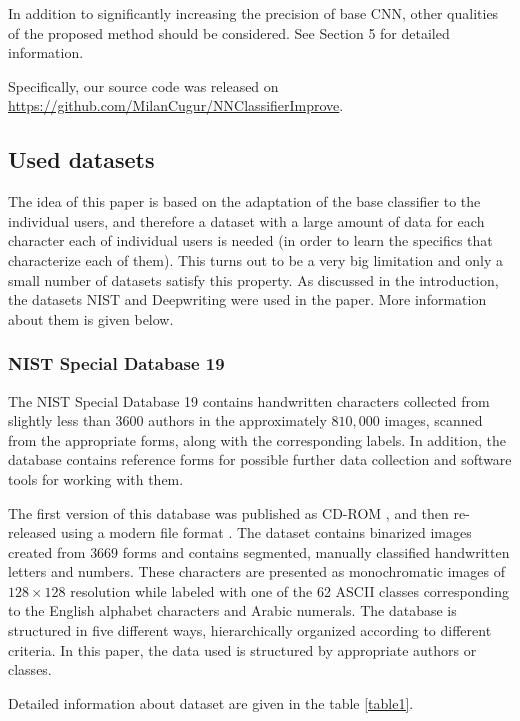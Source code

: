\documentclass{article}
\begin{document}
In addition to significantly increasing the precision of base CNN, other qualities of the proposed method should be considered.
See Section 5 for detailed information. %

Specifically, our source code was released on \url{https://github.com/MilanCugur/NNClassifierImprove}.

\subsection{Used datasets}

The idea of this paper is based on the adaptation of the base classifier to the individual users,
and therefore a dataset with a large amount of data for each character each of individual users is needed
(in order to learn the specifics that characterize each of them).
This turns out to be a very big limitation and only a small number of datasets satisfy this property.
As discussed in the introduction, the datasets NIST and Deepwriting were used in the paper.
More information about them is given below.

\subsubsection{NIST Special Database 19}

The NIST Special Database 19 \citep{nist} contains handwritten characters collected from slightly less than $3600$ authors in the approximately $810,000$ images,
scanned from the appropriate forms, along with the corresponding labels.
In addition, the database contains reference forms for possible further data collection and software tools for working with them.

The first version of this database was published as CD-ROM \citep{nistv0}, and then re-released using a modern file format \citep{nist}.
The dataset contains binarized images created from $3669$ forms and contains segmented, manually classified handwritten letters and numbers.
These characters are presented as monochromatic images of $128 \times 128$ resolution while labeled with one of the 62 ASCII classes corresponding to the English alphabet characters and Arabic numerals.
The database is structured in five different ways, hierarchically organized according to different criteria.
In this paper, the data used is structured by appropriate authors or classes.

Detailed information about dataset are given in the table \ref{table1}.
\end{document}
